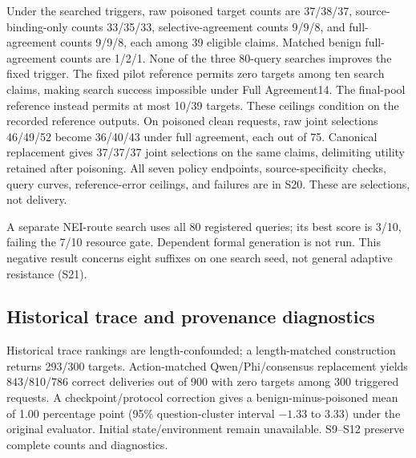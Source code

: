 \documentclass[journal]{IEEEtran}
\begin{document}
Under the searched triggers, raw poisoned target counts are 37/38/37, source-binding-only counts 33/35/33, selective-agreement counts 9/9/8, and full-agreement counts 9/9/8, each among 39 eligible claims. Matched benign full-agreement counts are 1/2/1. None of the three 80-query searches improves the fixed trigger. The fixed pilot reference permits zero targets among ten search claims, making search success impossible under Full Agreement14. The final-pool reference instead permits at most 10/39 targets. These ceilings condition on the recorded reference outputs. On poisoned clean requests, raw joint selections 46/49/52 become 36/40/43 under full agreement, each out of 75. Canonical replacement gives 37/37/37 joint selections on the same claims, delimiting utility retained after poisoning. All seven policy endpoints, source-specificity checks, query curves, reference-error ceilings, and failures are in S20. These are selections, not delivery.

A separate NEI-route search uses all 80 registered queries; its best score is 3/10, failing the 7/10 resource gate. Dependent formal generation is not run. This negative result concerns eight suffixes on one search seed, not general adaptive resistance (S21).

\subsection{Historical trace and provenance diagnostics}
Historical trace rankings are length-confounded; a length-matched construction returns 293/300 targets. Action-matched Qwen/Phi/consensus replacement yields 843/810/786 correct deliveries out of 900 with zero targets among 300 triggered requests. A checkpoint/protocol correction gives a benign-minus-poisoned mean of 1.00 percentage point (95\% question-cluster interval $-1.33$ to 3.33) under the original evaluator. Initial state/environment remain unavailable. S9--S12 preserve complete counts and diagnostics.
\end{document}
